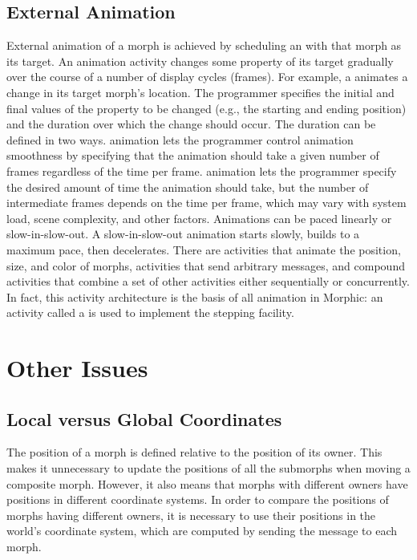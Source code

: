 \documentclass[letterpaper,10pt,english]{sphinxmanual}
\begin{document}
\subsection{External Animation}
\label{\detokenize{morphic:external-animation}}
External animation of a morph is achieved by scheduling an  with that morph as its target. An animation activity changes some property of its target gradually over the course of a number of display cycles (frames). For example, a  animates a change in its target morph's location. The programmer specifies the initial and final values of the property to be changed (e.g., the starting and ending position) and the duration over which the change should occur. The duration can be defined in two ways.  animation lets the programmer control animation smoothness by specifying that the animation should take a given number of frames regardless of the time per frame.  animation lets the programmer specify the desired amount of time the animation should take, but the number of intermediate frames depends on the time per frame, which may vary with system load, scene complexity, and other factors. Animations can be paced linearly or slow-in-slow-out. A slow-in-slow-out animation starts slowly, builds to a maximum pace, then decelerates. There are activities that animate the position, size, and color of morphs, activities that send arbitrary messages, and compound activities that combine a set of other activities either sequentially or concurrently. In fact, this activity architecture is the basis of all animation in Morphic: an activity called a  is used to implement the stepping facility.


\section{Other Issues}
\label{\detokenize{morphic:other-issues}}

\subsection{Local versus Global Coordinates}
\label{\detokenize{morphic:local-versus-global-coordinates}}
The position of a morph is defined relative to the position of its owner. This makes it unnecessary to update the positions of all the submorphs when moving a composite morph. However, it also means that morphs with different owners have positions in different coordinate systems. In order to compare the positions of morphs having different owners, it is necessary to use their positions in the world's coordinate system, which are computed by sending the  message to each morph.
\end{document}
